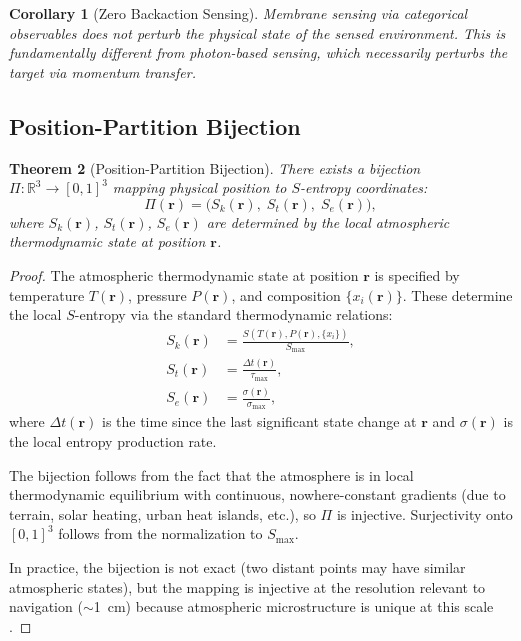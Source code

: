 \documentclass[12pt]{article}
\newtheorem{theorem}{Theorem}[section]
\newtheorem{corollary}[theorem]{Corollary}
\theoremstyle{definition}
\theoremstyle{remark}
\newcommand{\Sk}{S_k}
\newcommand{\St}{S_t}
\newcommand{\Se}{S_e}
\begin{document}
\begin{corollary}[Zero Backaction Sensing]
\label{cor:zero_backaction}
Membrane sensing via categorical observables does not perturb the physical state of the sensed environment. This is fundamentally different from photon-based sensing, which necessarily perturbs the target via momentum transfer.
\end{corollary}

\subsection{Position-Partition Bijection}

\begin{theorem}[Position-Partition Bijection]
\label{thm:position_partition}
There exists a bijection $\Pi: \mathbb{R}^3 \to [0,1]^3$ mapping physical position to $S$-entropy coordinates:
\begin{equation}
  \Pi(\mathbf{r}) = \big(\Sk(\mathbf{r}),\; \St(\mathbf{r}),\; \Se(\mathbf{r})\big),
  \label{eq:position_partition}
\end{equation}
where $\Sk(\mathbf{r})$, $\St(\mathbf{r})$, $\Se(\mathbf{r})$ are determined by the local atmospheric thermodynamic state at position $\mathbf{r}$.
\end{theorem}

\begin{proof}
The atmospheric thermodynamic state at position $\mathbf{r}$ is specified by temperature $T(\mathbf{r})$, pressure $P(\mathbf{r})$, and composition $\{x_i(\mathbf{r})\}$. These determine the local $S$-entropy via the standard thermodynamic relations:
\begin{align}
  \Sk(\mathbf{r}) &= \frac{S(T(\mathbf{r}), P(\mathbf{r}), \{x_i\})}{S_{\max}}, \label{eq:sk_r} \\
  \St(\mathbf{r}) &= \frac{\Delta t(\mathbf{r})}{\tau_{\max}}, \label{eq:st_r} \\
  \Se(\mathbf{r}) &= \frac{\sigma(\mathbf{r})}{\sigma_{\max}}, \label{eq:se_r}
\end{align}
where $\Delta t(\mathbf{r})$ is the time since the last significant state change at $\mathbf{r}$ and $\sigma(\mathbf{r})$ is the local entropy production rate.

The bijection follows from the fact that the atmosphere is in local thermodynamic equilibrium with continuous, nowhere-constant gradients (due to terrain, solar heating, urban heat islands, etc.), so $\Pi$ is injective. Surjectivity onto $[0,1]^3$ follows from the normalization to $S_{\max}$.

In practice, the bijection is not exact (two distant points may have similar atmospheric states), but the mapping is injective at the resolution relevant to navigation ($\sim$\SI{1}{cm}) because atmospheric microstructure is unique at this scale \cite{sachikonye2026atmospheric}.
\end{proof}
\end{document}
